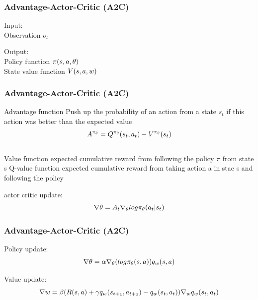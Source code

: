 \begin{frame}
    \frametitle{Advantage-Actor-Critic (A2C)}


\begin{PraesentationAufzaehlung}
    \item Input:\\
	Observation $o_t$
	\item Output:\\
	Policy function $\mathnormal{\pi(s, a, \theta)}$\\
	State value function $\mathnormal{V(s, a, w)}$	
\end{PraesentationAufzaehlung}

\end{frame}
\clearpage
\begin{frame}
    \frametitle{Advantage-Actor-Critic (A2C)}

\begin{PraesentationAufzaehlung}
	\item Advantage function
	Push up the probability of an action from a state $s_t$ if this action was better than the expected value
	\begin{equation}
	\mathnormal{
	A^{\pi_\theta} = Q^{\pi_\theta}(s_t, a_t) - V^{\pi_\theta}(s_t)
	}
	\end{equation}	\\
	Value function expected cumulative reward from following the policy $\pi$ from state s
	Q-value function expected cumulative reward from taking action a in stae s and following the policy

	\item actor critic update:
	\begin{equation}
		\mathnormal{
		\nabla \theta = A_t \nabla_\theta log \pi_\theta (a_t | s_t)}
	\end{equation}
\end{PraesentationAufzaehlung}

\end{frame}
\clearpage

\begin{frame}
    \frametitle{Advantage-Actor-Critic (A2C)}

\begin{PraesentationAufzaehlung}
    \item Policy update:
	\begin{equation}
		\mathnormal{\nabla \theta = \alpha \nabla_\theta (log \pi_\theta (s, a)) q_w (s, a)}
	\end{equation}	
	\item Value update:
	\begin{equation}
		\mathnormal{
		\nabla w = \beta (R(s, a) + \gamma q_w(s_{t+1}, a_{t+1}) - q_w(s_t, a_t)) \nabla_w q_w(s_t, a_t)}
	\end{equation}
\end{PraesentationAufzaehlung}

\end{frame}
\clearpage


